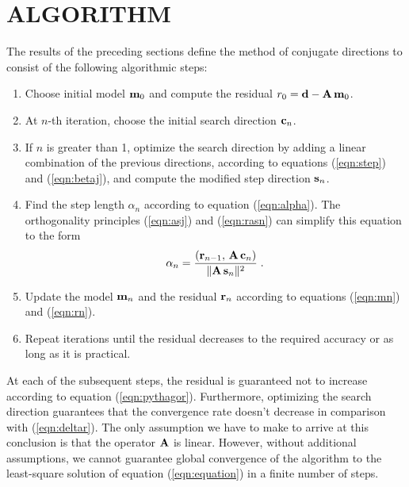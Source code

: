 \section{ALGORITHM}
The results of the preceding sections define the method of conjugate
directions to consist of the following algorithmic steps: 
\begin{enumerate}
\item Choose initial model ${\bf m}_0$ and compute the residual ${r}_0
= {\bf d - A\,m}_0$.  
\item At $n$-th iteration, choose the initial search direction ${\bf c}_n$.
\item If $n$ is greater than 1, optimize the search direction by
adding a linear combination of the previous directions, according to
equations (\ref{eqn:step}) and (\ref{eqn:betaj}), and compute the modified step
direction ${\bf s}_n$.
\item Find the step length $\alpha_n$ according to equation
(\ref{eqn:alpha}). The orthogonality principles (\ref{eqn:asj}) and (\ref{eqn:rasn}) can
simplify this equation to the form
\begin{equation}
\alpha_n = {{\left({\bf r}_{n-1},\,{\bf A\,c}_n\right)} \over
{\|{\bf A\,s}_n\|^2}}\;.
\label{eqn:alphan}
\end{equation}
\item Update the model ${\bf m}_n$ and the residual ${\bf r}_n$
according to equations (\ref{eqn:mn}) and (\ref{eqn:rn}). 
\item Repeat iterations until the residual decreases to the required
accuracy or as long as it is practical. 
\end{enumerate}
At each of the subsequent steps, the residual is guaranteed not to
increase according to equation (\ref{eqn:pythagor}). Furthermore,
optimizing the search direction guarantees that the convergence rate
doesn't decrease in comparison with (\ref{eqn:deltar}). The only assumption
we have to make to arrive at this conclusion is that the
operator ${\bf A}$ is linear. However, without additional assumptions, we cannot
guarantee global convergence of the algorithm to the least-square
solution of equation (\ref{eqn:equation}) in a finite number of steps.

